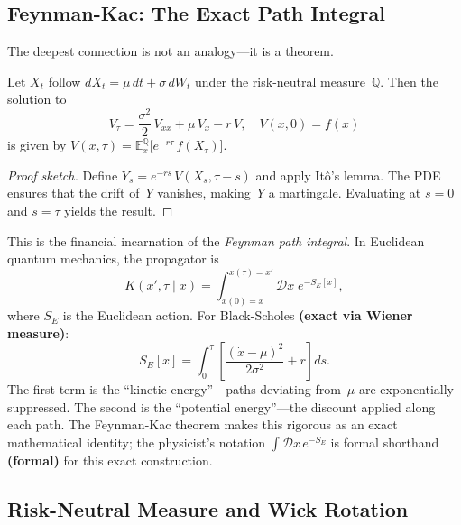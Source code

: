 \subsection{Feynman-Kac: The Exact Path Integral}

The deepest connection is not an analogy---it is a theorem.

\begin{theorem}\label{thm:feynman-kac}
Let $X_t$ follow $dX_t = \mu\,dt + \sigma\,dW_t$ under the risk-neutral measure~$\mathbb{Q}$.  Then the solution to
\begin{equation}
  V_\tau = \frac{\sigma^2}{2}\,V_{xx} + \mu\,V_x - r\,V,
  \quad V(x,0) = f(x)
\end{equation}
is given by $V(x, \tau) = \mathbb{E}^{\mathbb{Q}}_x\!\bigl[e^{-r\tau}\,f(X_\tau)\bigr]$.
\end{theorem}

\begin{proof}[Proof sketch]
Define $Y_s = e^{-rs}\,V(X_s, \tau - s)$ and apply It\^{o}'s lemma.  The PDE ensures that the drift of~$Y$ vanishes, making~$Y$ a martingale.  Evaluating at $s = 0$ and $s = \tau$ yields the result.
\end{proof}

This is the financial incarnation of the \emph{Feynman path integral}.  In Euclidean quantum mechanics, the propagator is
\begin{equation}\label{eq:path-integral}
  K(x', \tau \mid x)
  = \int_{x(0)=x}^{x(\tau)=x'} \mathcal{D}x\; e^{-S_E[x]},
\end{equation}
where $S_E$ is the Euclidean action.  For Black-Scholes \textbf{(exact via Wiener measure)}:
\begin{equation}\label{eq:euclidean-action}
  S_E[x] = \int_0^\tau
    \left[\frac{(\dot{x} - \mu)^2}{2\sigma^2} + r\right] ds.
\end{equation}
The first term is the ``kinetic energy''---paths deviating from~$\mu$ are exponentially suppressed.  The second is the ``potential energy''---the discount applied along each path.  The Feynman-Kac theorem makes this rigorous as an exact mathematical identity; the physicist's notation $\int \mathcal{D}x\,e^{-S_E}$ is formal shorthand \textbf{(formal)} for this exact construction.

\subsection{Risk-Neutral Measure and Wick Rotation}

